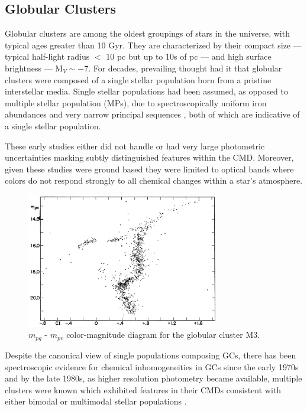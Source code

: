 \subsection{Globular Clusters}\label{sec:intro_GC}
Globular clusters \citep[GC,][]{Herschel1814} are among the oldest groupings of
stars in the universe, with typical ages greater than 10 Gyr. They are
characterized by their compact size --- typical half-light radius $<$ 10 pc but
up to 10s of pc --- and high surface brightness --- M$_{V} \sim -7$. For
decades, prevailing thought had it that globular clusters were composed of a single
stellar population born from a pristine interstellar media. Single stellar
populations had been assumed, as opposed to multiple stellar population
(MPs), due to spectroscopically uniform iron abundances \citep{Gratton2012} and
very narrow principal sequences \citep[e.g. Figure \ref{fig:M3CMD} taken
from][]{Sandage1953, Stetson1988}, both of which are indicative of a single
stellar population.  

These early studies either did not handle or had very large photometric
uncertainties masking subtly distinguished features within the CMD. Moreover,
given these studies were ground based they were limited to optical bands where
colors do not respond strongly to all chemical changes within a star's
atmosphere.

\begin{figure}
	\centering
	\includegraphics[width=0.75\textwidth]{src/Figures/Gould53.png}
	\caption{$m_{pg}$ - $m_{pv}$ color-magnitude diagram for the globular cluster M3.}
	\label{fig:M3CMD}
\end{figure}

Despite the canonical view of single populations composing GCs, there has been
spectroscopic evidence for chemical inhomogeneities in GCs since the early
1970s \citep[e.g.][]{Osborn1971} and by the late 1980s, as higher resolution
photometry became available, multiple clusters were known which exhibited
features in their CMDs consistent with either bimodal or multimodal stellar
populations \citep[e.g.][]{Norris1987}.

